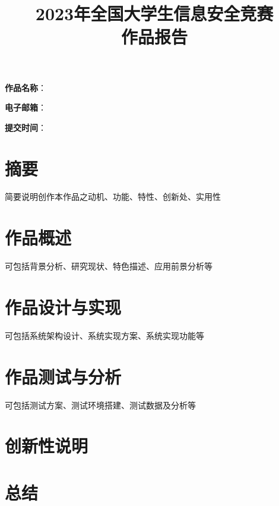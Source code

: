\documentclass[12pt,a4paper]{ctexart}
\date{}
\title{\Huge\textbf{2023年全国大学生信息安全竞赛\\作品报告}}
\begin{document}
\maketitle
\vspace{6cm}
{
    \Large\textbf{作品名称}：\textbf{\underline{}}

    \textbf{\underline{}}

    \textbf{电子邮箱}：\underline{}

    \textbf{提交时间}：\underline{\makebox[10cm]{\textbf{\today}}}
}
\clearpage

\clearpage
\tableofcontents
\clearpage
\section*{摘要}
简要说明创作本作品之动机、功能、特性、创新处、实用性
\section{作品概述}
可包括背景分析、研究现状、特色描述、应用前景分析等
\section{作品设计与实现}
可包括系统架构设计、系统实现方案、系统实现功能等
\section{作品测试与分析}
可包括测试方案、测试环境搭建、测试数据及分析等
\section{创新性说明}
\section{总结}
\end{document}
